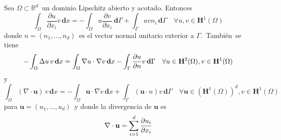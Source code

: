 \begin{teo}	
	Sea $\Omega \subset \mathbb{R}^{d}$\ un dominio Lipschitz abierto y acotado.
	Entonces
	\[
	\int_{\Omega }\frac{\partial u}{\partial x_{i}}v\,\mathbf{d}%
	x=-\int_{\Omega }u\frac{\partial v}{\partial x_{i}}\,\mathbf{d}%
	\Gamma +\int_{\Gamma }uvn_{i}\,\mathbf{d}\Gamma \quad \forall u,v\in
	\mathbf{H}^{1}(\Omega )
	\]
	donde $n=\left( n_{1},...,n_{d}\right) $\ es el vector normal unitario
	exterior a $\Gamma $.\ También\ se tiene
	\[
	-\int_{\Omega }\Delta u\,v\,\mathbf{d}x=\int_{\Omega }\nabla
	u\cdot \nabla v\,\mathbf{d}x-\int_{\Gamma }\frac{%
		\partial u}{\partial n}v\,\mathbf{d}\Gamma \quad \forall u\in \mathbf{H}%
	^{2}(\Omega ),v\in \mathbf{H}^{1}(\Omega )
	\]
	y
	\[
	\int_{\Omega }\left( \nabla\cdot\mathbf{u}\right) \,v\,\mathbf{d}%
	x=-\int_{\Omega }\mathbf{u}\cdot \nabla v\,\mathbf{d}%
	x+\int_{\Gamma }\left( \mathbf{u}\cdot n\right) v\,\mathbf{d}\Gamma
	\quad \forall \mathbf{u}\in \left( \mathbf{H}^{1}(\Omega )\right) ^{d},v\in
	\mathbf{H}^{1}(\Omega )
	\]
	para $\mathbf{u}=\left( u_{1},...,u_{d}\right) $\ y donde  la divergencia de $\mathbf{u}$ es
	\[
	\nabla\cdot\mathbf{u}=\sum_{i=1}^{d}\frac{\partial u_{i}}{%
		\partial x_{i}}
	\]
\end{teo}


